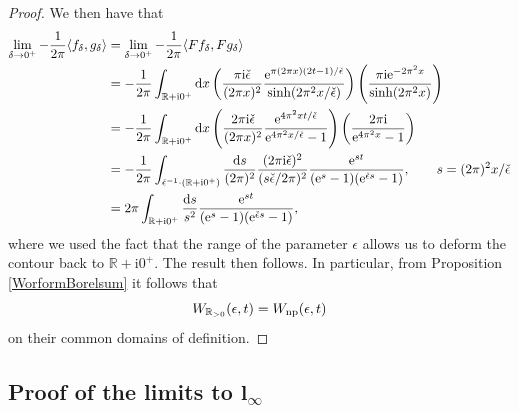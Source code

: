 \documentclass[pdftex]{sigma}
\numberwithin{equation}{section}
\begin{document}
\begin{proof}
We then have that
\begin{equation*}
\begin{split}
 \lim_{\delta\to 0^+}-\frac{1}{2\pi}\langle f_\delta,g_\delta\rangle&=\lim_{\delta\to 0^+}-\frac{1}{2\pi}\langle Ff_\delta,Fg_\delta\rangle\\
 &=-\frac{1}{2\pi}\int_{\mathbb{R}+\mathrm{i} 0^+}{\rm d}x \left(\frac{\pi \mathrm{i} \check\epsilon}{(2\pi x)^2}\frac{{\rm e}^{\pi (2\pi x)(2t-1)/\check{\epsilon}}}{\sinh(2\pi^2x /\check{\epsilon})}\right)\left(\frac{\pi {\rm i}{\rm e}^{-2\pi^2x}}{\sinh(2\pi^2x)}\right)\\
 &=-\frac{1}{2\pi}\int_{\mathbb{R}+{\rm i}0^+}{\rm d}x \left(\frac{2\pi \mathrm{i} \check\epsilon}{(2\pi x)^2}\frac{{\rm e}^{4\pi^2xt/\check\epsilon}}{{\rm e}^{4\pi^2x/\check\epsilon}-1}\right)\left(\frac{2\pi \mathrm{i}}{{\rm e}^{4\pi^2x}-1}\right)\\
 &=-\frac{1}{2\pi}\int_{\check{\epsilon}^{-1}\cdot(\mathbb{R}+\mathrm{i} 0^+)}\frac{{\rm d}s}{(2\pi)^2}\frac{(2\pi \mathrm{i} \check\epsilon)^2}{(s\check\epsilon/2\pi)^2}\frac{{\rm e}^{st}}{({\rm e}^s-1)({\rm e}^{\check\epsilon s}-1)}, \qquad s=(2\pi)^2x/\check\epsilon\\
 &=2\pi \int_{\mathbb{R}+\mathrm{i} 0^+}\frac{{\rm d}s}{s^2} \frac{{\rm e}^{st}}{({\rm e}^s-1)({\rm e}^{\check\epsilon s}-1)},
\end{split}
\end{equation*}
where we used the fact that the range of the parameter $\epsilon$ allows us to deform the contour back to $\mathbb{R}+\mathrm{i}0^{+}$. The result then follows. In particular, from Proposition \ref{WorformBorelsum} it follows that
\begin{equation*}
 W_{\mathbb{R}_{>0}}(\epsilon,t)=W_{{\rm np}}(\epsilon,t)
\end{equation*}
on their common domains of definition.
\end{proof}

\subsection[Proof of the limits to $l_{\infty}$]{Proof of the limits to $\boldsymbol{l_{\infty}}$}\label{linftylimit}
\end{document}
